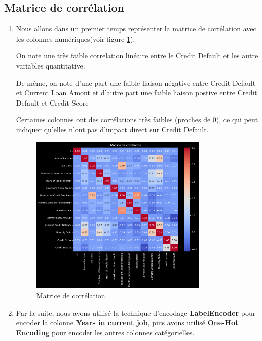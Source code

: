 \subsection{Matrice de corrélation}
\begin{flushleft}
\begin{enumerate}
\item Nous allons dans un premier temps représenter la matrice de corrélation avec les colonnes numériques(voir figure \ref{fig:matrice_corr}). 
\begin{flushleft}
On note une très faible correlation linéaire entre le Credit Default et les autre variables quantitative.

De même, on note d'une part une faible liaison négative entre Credit Default et Current Loan Amont et d'autre part une faible liaison postive entre Credit Default et Credit Score

Certaines colonnes ont des corrélations très faibles (proches de 0), ce qui peut indiquer qu'elles n'ont pas d'impact direct sur Credit Default.
\end{flushleft} 

\begin{figure}[H]
\centering
\includegraphics[width=0.8\textwidth]{figures/Matrice1.png}
\caption{Matrice de corrélation.}
\label{fig:matrice_corr}
\end{figure}


\item Par la suite, nous avons utilisé la technique d'encodage \textbf{LabelEncoder} pour encoder la colonne \textbf{Years in current job}, puis avons utilisé \textbf{One-Hot Encoding} pour encoder les autres colonnes catégorielles. 
\end{enumerate}
\end{flushleft}
